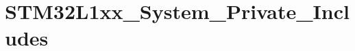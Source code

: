 \hypertarget{group___s_t_m32_l1xx___system___private___includes}{\section{S\-T\-M32\-L1xx\-\_\-\-System\-\_\-\-Private\-\_\-\-Includes}
\label{group___s_t_m32_l1xx___system___private___includes}
}
